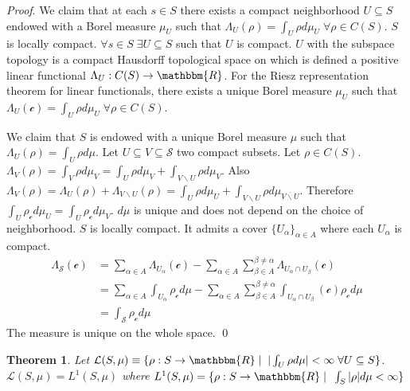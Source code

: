 \documentclass[aps,pra,10pt,twocolumn,floatfix,nofootinbib]{revtex4-1}
\numberwithin{equation}{section}
\newtheorem{thrm}[equation]{Theorem}
\theoremstyle{definition}
\renewenvironment{proof}{\emph{Proof}.}{\qed}
\begin{document}
\begin{proof}
	We claim that at each $s \in S$ there exists a compact neighborhood $U \subseteq S$ endowed with a Borel measure $\mu_U$ such that $\Lambda_U (\rho) = \int_U \rho d \mu_U \; \forall \rho \in C(S)$. $S$ is locally compact. $\forall s \in S \; \exists U \subseteq S$ such that $U$ is compact. $U$ with the subspace topology is a compact Hausdorff topological space on which is defined a positive linear functional $\Lambda_U : C(S) \rightarrow \mathbbm{R}$. For the Riesz representation theorem for linear functionals, there exists a unique Borel measure $\mu_U$ such that $\Lambda_U (\mathcal{c}) = \int_U \rho d \mu_U \; \forall \rho \in C(S)$.
	
	We claim that $S$ is endowed with a unique Borel measure $\mu$ such that $\Lambda_U (\rho) = \int_U \rho d \mu$. Let $U \subseteq V \subseteq \mathcal{S}$ two compact subsets. Let $\rho \in C(S)$. $\Lambda_V (\rho) = \int_V \rho d \mu_V = \int_U \rho d \mu_V + \int_{V\backslash U} \rho d \mu_V$. Also $\Lambda_V (\rho) = \Lambda_U (\rho) + \Lambda_{V\backslash U} (\rho) = \int_U \rho d \mu_U + \int_{V \backslash U} \rho d \mu_{\overline{V \backslash U}} $. Therefore $\int_{U} \rho_{\mathcal{c}} d \mu_U = \int_{U} \rho_{\mathcal{c}} d \mu_V$. $d\mu$ is unique and does not depend on the choice of neighborhood. $S$ is locally compact. It admits a cover $\{U_\alpha\}_{\alpha \in A}$ where each $U_\alpha$ is compact.
	\begin{align*}
	\Lambda_{\mathcal{S}}(\mathcal{c}) &= \sum \limits_{\alpha \in A} \Lambda_{U_\alpha}(\mathcal{c}) - \sum \limits_{\alpha \in A} \sum \limits_{\beta \in A}^{\beta \neq\alpha} \Lambda_{U_\alpha \cap U_\beta}(\mathcal{c}) \\
	&= \sum \limits_{\alpha \in A} \int_{U_\alpha} \rho_{\mathcal{c}} d\mu - \sum \limits_{\alpha \in A} \sum \limits_{\beta \in A}^{\beta \neq\alpha} \int_{U_\alpha \cap U_\beta}(\mathcal{c}) \rho_{\mathcal{c}} d\mu \\
	&= \int_{\mathcal{S}} \rho_{\mathcal{c}} d\mu
	\end{align*}
	The measure is unique on the whole space.
\end{proof}

\begin{thrm}\label{everywhere_integrable_is_lebesgue_integrable}
	Let $\mathcal{L}(S,\mu) \equiv \{ \rho : S \rightarrow \mathbbm{R} \; | \;\; |\int_{U} \rho d\mu| < \infty \; \forall U \subseteq S\}$. $\mathcal{L}(S,\mu)=L^1(S,\mu)$ where $L^1(S,\mu) = \{ \rho : S \rightarrow \mathbbm{R} \; | \;\; \int_{S} |\rho| d\mu < \infty \}$
\end{thrm}
\end{document}
